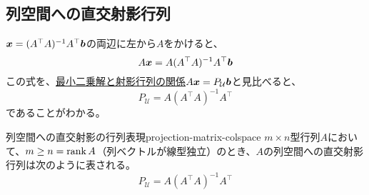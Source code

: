 \documentclass[../../../topic_linear-algebra]{subfiles}
\begin{document}
\subsection{列空間への直交射影行列}

$\vb*{x} = (A^\top A)^{-1}A^\top \vb*{b}$の両辺に左から$A$をかけると、
\begin{equation*}
  A\vb*{x} = A(A^\top A)^{-1}A^\top \vb*{b}
\end{equation*}
この式を、\hyperref[thm:least-squares-projection]{最小二乗解と射影行列の関係}$A\vb*{x} = P_{\mathcal{U}}\vb*{b}$と見比べると、
\begin{equation*}
  P_{\mathcal{U}} = A(A^\top A)^{-1}A^\top
\end{equation*}
であることがわかる。

\begin{theorem}{列空間への直交射影の行列表現}{projection-matrix-colspace}
  $m \times n$型行列$A$において、$m \geq n = \rank A$（列ベクトルが線型独立）のとき、$A$の列空間への直交射影行列は次のように表される。
  \begin{equation*}
    P_{\mathcal{U}} = A(A^\top A)^{-1}A^\top
  \end{equation*}
\end{theorem}
\end{document}
